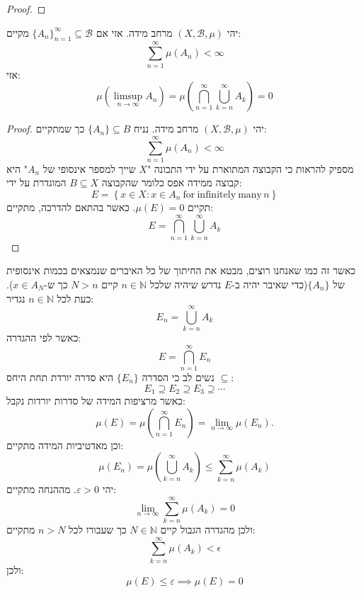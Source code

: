 \documentclass{tstextbook}
\begin{document}
\begin{proof}
\end{proof}
\begin{theorem}
יהי \(\left( X,\mathcal{B},\mu \right)\) מרחב מידה. אזי אם \(\{ A_{n} \}_{n=1}^{\infty}\subseteq \mathcal{B}\) מקיים:
$$\sum_{n=1}^{\infty}\mu\left(A_{n}\right)<\infty$$
אזי:
$$\mu\left(\limsup_{n\to\infty}A_{n}\right)=\mu\left( \bigcap_{n=1}^{\infty}\bigcup_{k=n}^{\infty}A_{k} \right)=0$$

\end{theorem}
\begin{proof}
יהי \(\left( X,\mathcal{B} , \mu \right)\) מרחב מידה. נניח \(\{ A_{n} \}\subseteq B\) כך שמתקיים:
$$\sum_{n=1}^{\infty}\mu\left(A_{n}\right)<\infty$$
מספיק להראות כי הקבוצה המתוארת על ידי התכונה "\(X\) שייך למספר אינסופי של \(A_{n}\)" היא קבוצה ממידה אפס כלומר שהקבוצה \(B\subseteq X\) המוגדרת על ידי:
$$E=\left\{x\in X:x\in A_{n}{\mathrm{~for~infinitely~many}}\,n\right\}$$
תקיים \(\mu(E)=0\). כאשר בהתאם להדרכה, מתקיים:
$$E=\bigcap_{n=1}^{\infty}\bigcup_{k=n}^{\infty}A_{k}$$

\end{proof}
כאשר זה כמו שאנחנו רוצים, מבטא את החיתוך של כל האיברים שנמצאים בכמות אינסופית של \(\{ A_{n} \}\)(כדי שאיבר יהיה ב-\(E\) נדרש שיהיה שלכל \(n \in \mathbb{N}\) קיים \(N>n\) כך ש-\(x \in A_{N}\)). כעת לכל \(n \in \mathbb{N}\) נגדיר:
$$E_{n}=\bigcup_{k=n}^{\infty}A_{k}$$
כאשר לפי ההגדרה: 
$$E=\bigcap_{n=1}^{\infty}E_{n}$$
נשים לב כי הסדרה \(\{ E_{n} \}\) היא סדרה יורדת תחת היחס \(\subseteq\):
$$E_{1}\supseteq E_{2}\supseteq E_{3}\supseteq\cdots$$
כאשר מרציפות המידה של סדרות יורדות נקבל:
$$\mu(E)=\mu\left(\bigcap_{n=1}^{\infty}E_{n}\right)=\operatorname*{lim}_{n\to\infty}\mu(E_{n}).$$
וכן מאדטיביות המידה מתקיים:
$$\mu(E_{n})=\mu\left(\bigcup_{k=n}^{\infty}A_{k}\right)\leq\sum_{k=n}^{\infty}\mu(A_{k})$$
יהי \(\varepsilon> 0\). מההנחה מתקיים:
$$\lim_{ n \to \infty } \sum_{k=n}^{\infty} \mu(A_{k})=0$$
ולכן מהגדרה הגבול קיים \(N \in \mathbb{N}\) כך שעבורו לכל \(n > N\) מתקיים:
$$\sum_{k=n}^{\infty}\mu(A_{k})<\epsilon$$
ולכן:
$$\mu(E)\leq \varepsilon\implies \mu(E)=0$$
\end{document}
